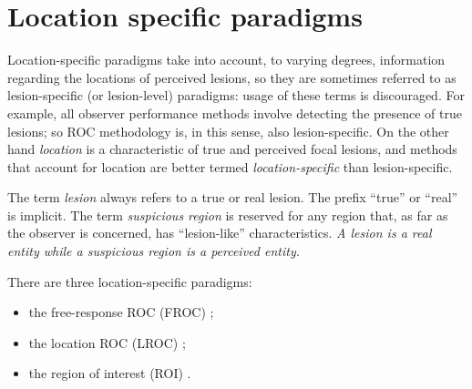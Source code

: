 \documentclass[
]{book}
\providecommand{\tightlist}{%
  \setlength{\itemsep}{0pt}\setlength{\parskip}{0pt}}
\begin{document}
\hypertarget{location-specific-paradigms}{%
\section{Location specific paradigms}\label{location-specific-paradigms}}

Location-specific paradigms take into account, to varying degrees, information regarding the locations of perceived lesions, so they are sometimes referred to as lesion-specific (or lesion-level) paradigms: usage of these terms is discouraged. For example, all observer performance methods involve detecting the presence of true lesions; so ROC methodology is, in this sense, also lesion-specific. On the other hand \emph{location} is a characteristic of true and perceived focal lesions, and methods that account for location are better termed \emph{location-specific} than lesion-specific.

The term \emph{lesion} always refers to a true or real lesion. The prefix ``true'' or ``real'' is implicit. The term \emph{suspicious region} is reserved for any region that, as far as the observer is concerned, has ``lesion-like'' characteristics. \emph{A lesion is a real entity while a suspicious region is a perceived entity.}

There are three location-specific paradigms:

\begin{itemize}
\tightlist
\item
  the free-response ROC (FROC) \citep{bunch1977free, chakraborty1989maximum};
\item
  the location ROC (LROC) \citep{starr1977comments, swensson1996unified};
\item
  the region of interest (ROI) \citep{obuchowski2010data}.
\end{itemize}
\end{document}
